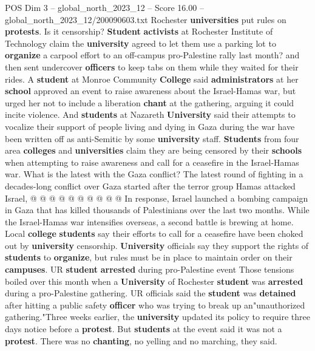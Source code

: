 \begin{textsample}{POS Dim 3 – global\_north\_2023\_12 – Score 16.00 – global\_north\_2023\_12/200090603.txt}  \label{ex:f3_pos_261}
Rochester \textbf{universities} put rules on \textbf{protests}.
Is it censorship? \textbf{Student} \textbf{activists} at Rochester Institute of Technology claim the \textbf{university} agreed to let them use a parking lot to \textbf{organize} a carpool effort to an off-campus pro-Palestine rally last month? and then sent undercover \textbf{officers} to keep tabs on them while they waited for their rides.
A \textbf{student} at Monroe Community \textbf{College} said \textbf{administrators} at her \textbf{school} approved an event to raise awareness about the Israel-Hamas war, but urged her not to include a liberation \textbf{chant} at the gathering, arguing it could incite violence.
And \textbf{students} at Nazareth \textbf{University} said their attempts to vocalize their support of people living and dying in Gaza during the war have been written off as anti-Semitic by some \textbf{university} staff. \textbf{Students} from four area \textbf{colleges} and \textbf{universities} claim they are being censored by their \textbf{schools} when attempting to raise awareness and call for a ceasefire in the Israel-Hamas war.
What is the latest with the Gaza conflict?
The latest round of fighting in a decades-long conflict over Gaza started after the terror group Hamas attacked Israel, @ @ @ @ @ @ @ @ @ @ In response, Israel launched a bombing campaign in Gaza that has killed thousands of Palestinians over the last two months.
While the Israel-Hamas war intensifies overseas, a second battle is brewing at home.
Local \textbf{college} \textbf{students} say their efforts to call for a ceasefire have been choked out by \textbf{university} censorship. \textbf{University} officials say they support the rights of \textbf{students} to \textbf{organize}, but rules must be in place to maintain order on their \textbf{campuses}.
UR \textbf{student} \textbf{arrested} during pro-Palestine event Those tensions boiled over this month when a \textbf{University} of Rochester \textbf{student} was \textbf{arrested} during a pro-Palestine gathering.
UR officials said the \textbf{student} was \textbf{detained} after hitting a public safety \textbf{officer} who was trying to break up an"unauthorized gathering."Three weeks earlier, the \textbf{university} updated its policy to require three days notice before a \textbf{protest}.
But \textbf{students} at the event said it was not a \textbf{protest}.
There was no \textbf{chanting}, no yelling and no marching, they said.

\end{textsample}
